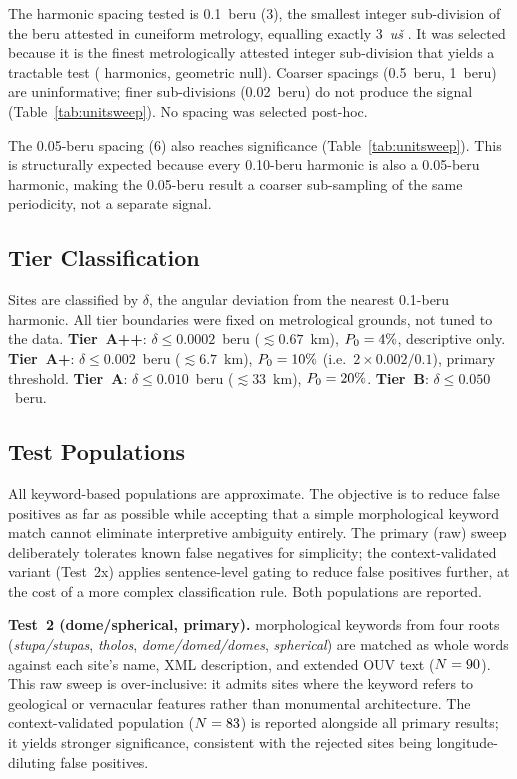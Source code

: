 \documentclass[HARVARD,twocolumn]{USG}
\begin{document}
The harmonic spacing tested is 0.1~beru (3\textdegree{}), the smallest integer
sub-division of the beru attested in cuneiform metrology, equalling exactly
3~\textit{u\v{s}} \citep{hunger2019mul,robson2008mathematics,powell1987metrological}.
It was selected because it is the finest metrologically attested integer
sub-division that yields a tractable test (\NharmonicsCoarse{} harmonics, \NullRateAp{} geometric null).
Coarser spacings (0.5~beru, 1~beru) are uninformative; finer sub-divisions
(0.02~beru) do not produce the signal (Table~\ref{tab:unitsweep}).
No spacing was selected post-hoc.

The 0.05-beru spacing (6\textdegree{}) also reaches significance
(Table~\ref{tab:unitsweep}). This is structurally expected because every
0.10-beru harmonic is also a 0.05-beru harmonic, making the 0.05-beru
result a coarser sub-sampling of the same periodicity, not a separate signal.

\subsection{Tier Classification}

Sites are classified by $\delta$, the angular deviation from the
nearest 0.1-beru harmonic. All tier boundaries were fixed on metrological
grounds, not tuned to the data.
\textbf{Tier~A++}: $\delta \leq 0.0002$~beru ($\lesssim 0.67$~km), $P_0 = 4\%{}$, descriptive only.
\textbf{Tier~A+}: $\delta \leq 0.002$~beru ($\lesssim 6.7$~km), $P_0 = 10\%{}$ (i.e.\ $2 \times 0.002/0.1$), primary threshold.
\textbf{Tier~A}: $\delta \leq 0.010$~beru ($\lesssim 33$~km), $P_0 = 20\%{}$.
\textbf{Tier~B}: $\delta \leq 0.050$~beru.

\subsection{Test Populations}
\label{sec:test_populations}

All keyword-based populations are approximate. The objective is to
reduce false positives as far as possible while accepting that a
simple morphological keyword match cannot eliminate interpretive
ambiguity entirely. The primary (raw) sweep deliberately tolerates
known false negatives for simplicity; the context-validated variant
(Test~2x) applies sentence-level gating to reduce false positives
further, at the cost of a more complex classification rule.
Both populations are reported.

\textbf{Test~2 (dome/spherical, primary).}
\NcircKeywords{} morphological keywords from four roots
(\textit{stupa/stupas}, \textit{tholos}, \textit{dome/domed/domes},
\textit{spherical}) are matched as whole words against each site's
name, XML description, and extended OUV text ($N = 90$).
This raw sweep is over-inclusive: it admits sites where the keyword
refers to geological or vernacular features rather than monumental
architecture. The context-validated population ($N = 83$)
is reported alongside all primary results; it yields stronger
significance, consistent with the rejected sites being
longitude-diluting false positives.
\end{document}
